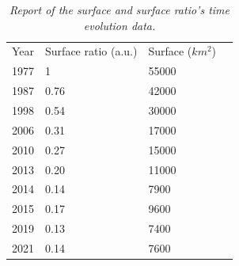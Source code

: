 \begin{table}[H]
	\centering
    \begin{tabular}{|l|l|l|l}
    \cline{1-3}
    Year & Surface ratio (a.u.) & Surface ($km^2$) & \\ \cline{1-3}
    1977 & 1                    &            55000 & \\ \cline{1-3}
    1987 & 0.76                 &            42000 & \\ \cline{1-3}
    1998 & 0.54                 &            30000 & \\ \cline{1-3}
    2006 & 0.31                 &            17000 & \\ \cline{1-3}
    2010 & 0.27                 &            15000 & \\ \cline{1-3}
    2013 & 0.20                 &            11000 & \\ \cline{1-3}
    2014 & 0.14                 &             7900 & \\ \cline{1-3}
    2015 & 0.17                 &             9600 & \\ \cline{1-3}
    2019 & 0.13                 &             7400 & \\ \cline{1-3}
    2021 & 0.14                 &             7600 & \\ \cline{1-3}
    \end{tabular}
    \caption{\emph{Report of the surface and surface ratio's time evolution data.}}
    \label{tab:table}
\end{table}
